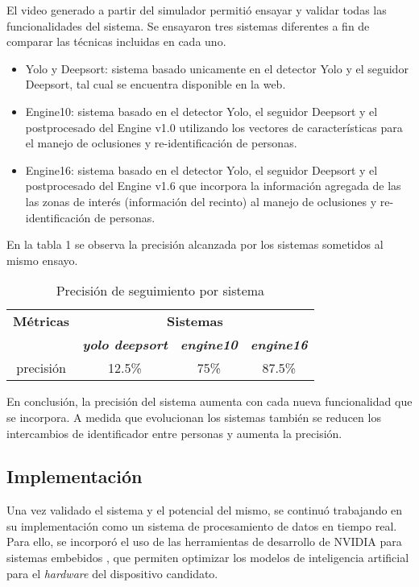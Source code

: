 \documentclass[a4paper]{IEEEtran}
\begin{document}
El video generado a partir del simulador permitió ensayar y validar todas las funcionalidades del sistema. Se ensayaron tres sistemas diferentes a fin de comparar las técnicas incluidas en cada uno.

\begin{itemize}
\item Yolo y Deepsort: sistema basado unicamente en el detector Yolo y el seguidor Deepsort, tal cual se encuentra disponible en la web.
\item Engine10: sistema basado en el detector Yolo, el seguidor Deepsort y el postprocesado del Engine v1.0 utilizando los vectores de características para el manejo de oclusiones y re-identificación de personas.
\item Engine16: sistema basado en el detector Yolo, el seguidor Deepsort y el postprocesado del Engine v1.6 que incorpora la información agregada de las las zonas de interés (información del recinto) al manejo de oclusiones y re-identificación de personas.
\end{itemize}

En la tabla 1 se observa la precisión alcanzada por los sistemas sometidos al mismo ensayo.

\begin{table}[htbp]
\caption{Precisión de seguimiento por sistema}
\begin{center}
\begin{tabular}{|c|c|c|c|}
\hline
\textbf{Métricas}&\multicolumn{3}{|c|}{\textbf{Sistemas}} \\
\cline{2-4}
\textbf{} & \textbf{\textit{yolo deepsort}}& \textbf{\textit{engine10}}& \textbf{\textit{engine16}} \\
\hline
precisión & 12.5\% & 75\% & 87.5\% \\
\hline
\end{tabular}
\label{tab1}
\end{center}
\end{table}

En conclusión, la precisión del sistema aumenta con cada nueva funcionalidad que se incorpora. A medida que evolucionan los sistemas también se reducen los intercambios de identificador entre personas y aumenta la precisión.

\subsection{Implementación}

Una vez validado el sistema y el potencial del mismo, se continuó trabajando en su implementación como un sistema de procesamiento de datos en tiempo real. Para ello, se incorporó el uso de las herramientas de desarrollo de NVIDIA para sistemas embebidos \cite{b18}, que permiten optimizar los modelos de inteligencia artificial para el \textit{hardware} del dispositivo candidato.
\end{document}
